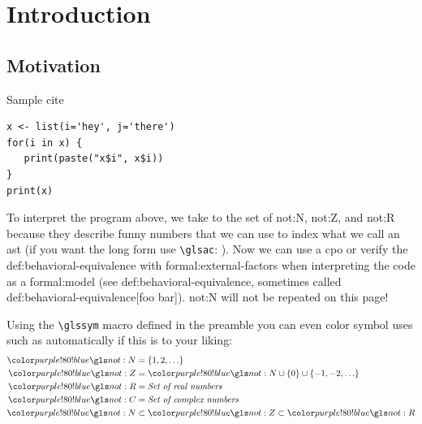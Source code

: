 \setchaptertoc
\chapter{Introduction}\label{chp:introduction}

\section{Motivation}

Sample cite~\cite{DBLP:conf/msr/SihlerPSTDD24}

\begin{verbatim}
x <- list(i='hey', j='there')
for(i in x) {
   print(paste("x$i", x$i))
}
print(x)
\end{verbatim}


To interpret the program above, we take  to the set of \gls{not:N}, \gls{not:Z}, and \gls{not:R} because they describe funny numbers that we can use to index what we call an \gls{ast} (if you want the long form use \texttt{\textbackslash glsac}: ). Now we can use a \gls{cpo} or verify the \gls{def:behavioral-equivalence} with \glspl{formal:external-factor} when interpreting the code as a \Gls{formal:model} (see \gls{def:behavioral-equivalence}, sometimes called \gls{def:behavioral-equivalence}[foo bar]).
\gls{not:N} will not be repeated on this page!

Using the \texttt{\textbackslash glssym} macro defined in the preamble you can even color symbol uses such as  automatically if this is to your liking:
\begin{align}
   \glssym{not:N} &= \{1, 2, \ldots\} \\
   \glssym{not:Z} &= \glssym{not:N} \cup \{0\} \cup \{-1, -2, \ldots\} \\
   \glssym{not:R} &= \textit{Set of real numbers} \\
   \glssym{not:C} &= \textit{Set of complex numbers} \\
   \glssym{not:N} &\subset \glssym{not:Z} \subset \glssym{not:R} %
\end{align}

